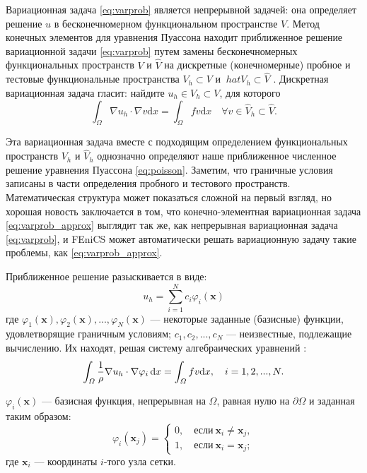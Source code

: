 Вариационная задача \eqref{eq:varprob} является непрерывной задачей: она определяет решение $u$ в бесконечномерном функциональном пространстве $V$. Метод конечных элементов для уравнения Пуассона находит приближенное решение вариационной задачи \eqref{eq:varprob} путем замены бесконечномерных функциональных пространств $V$ и $\hat V$ на дискретные (конечномерные) пробное и тестовые функциональные пространства $V_h \subset V$ и $\ hat V_h \subset \hat V$ \cite[с. 14]{FEniCS}. Дискретная вариационная задача гласит: найдите $u_h \in V_h \subset V$, для которого
\begin{equation} \label{eq:varprob_approx}
\int_{\Omega} \nabla u_{h} \cdot \nabla v \mathrm{d} x=\int_{\Omega} f v \mathrm{d} x \quad \forall v \in \hat{V}_{h} \subset \hat{V}.
\end{equation}

Эта вариационная задача вместе с подходящим определением функциональных пространств $V_h$ и $\hat V_h$ однозначно определяют наше приближенное численное решение уравнения Пуассона \eqref{eq:poisson}. Заметим, что граничные условия записаны в части определения пробного и тестового пространств. Математическая структура может показаться сложной на первый взгляд, но хорошая новость заключается в том, что конечно-элементная вариационная задача \eqref{eq:varprob_approx} выглядит так же, как непрерывная вариационная задача \eqref{eq:varprob}, и FEniCS может автоматически решать вариационную задачу такие проблемы, как \eqref{eq:varprob_approx}.

Приближенное решение разыскивается в виде:
\begin{equation}
u_h = \sum_{i=1}^N c_i \varphi_i(\bm x)
\end{equation}
где $\varphi_1(\bm x), \varphi_2(\bm x), ..., \varphi_N(\bm x)$
--- некоторые заданные (базисные) функции,
удовлетворящие граничным условиям;
$c_1, c_2, ..., c_N$ --- неизвестные, подлежащие вычислению.
Их находят, решая систему алгебраических уравнений \cite[с. 14]{FEM_intro}:
\begin{equation}
\int_\varOmega \frac 1 \rho \nabla u_h \cdot \nabla \varphi_i \, \mathrm{d}x = \int_{\varOmega} f v \mathrm{d} x, \quad i = 1, 2, ..., N.
\end{equation}

$\varphi_i(\bm x)$ --- базисная функция, непрерывная на $\Omega$,
равная нулю на $\partial \Omega$ и заданная таким образом:
\begin{equation}
\varphi_i(\bm x_j) =
\left\{ \begin{aligned}
    0, \quad \text{если} \ \bm x_i \neq \bm x_j, \\
    1, \quad \text{если} \ \bm x_i = \bm x_j;
\end{aligned} \right.
\end{equation}
где $\bm x_i$ --- координаты $i$-того узла сетки.

\clearpage